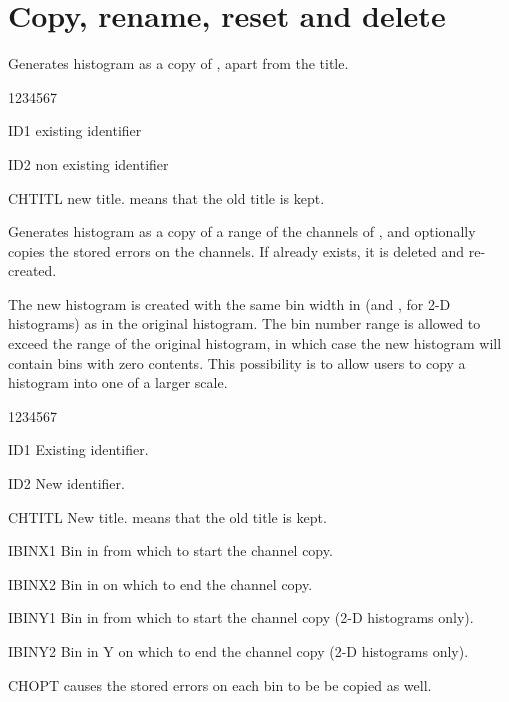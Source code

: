 \section{Copy, rename, reset and delete}
\label{HCOREDEL}
 

\Action Generates histogram 
as a copy of , apart from the title.

\Idesc
\begin{DLttc}{1234567}
\item[ID1] existing identifier
\item[ID2] non existing identifier
\item[CHTITL] new title.  means that the old title is kept.
\end{DLttc}


\Action Generates histogram 
as a copy of a range of the channels of , and optionally
copies the stored errors on the channels.
If  already exists, it is deleted and re-created.

The new histogram is created with the same bin width in  (and
, for 2-D histograms) as in the original histogram.  The bin
number range is allowed to exceed the range of the original histogram,
in which case the new histogram will contain bins with zero contents.
This possibility is to allow users to copy a histogram into one of a
larger scale.

\Idesc
\begin{DLttc}{1234567}
\item[ID1] Existing identifier.
\item[ID2] New identifier.
\item[CHTITL] New title.  means that the old title is kept.
\item[IBINX1] Bin in  from which to start the channel copy.
\item[IBINX2] Bin in  on which to end the channel copy.
\item[IBINY1] Bin in  from which to start the channel copy
              (2-D histograms only).
\item[IBINY2] Bin in Y on which to end the channel copy
              (2-D histograms only).
\item[CHOPT]   causes the stored errors on each bin to be
              be copied as well. 
\end{DLttc}

